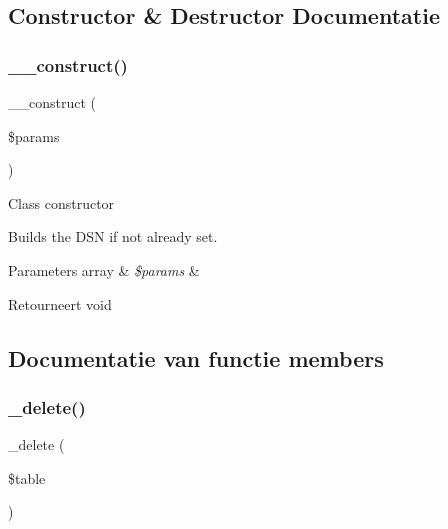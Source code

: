 \subsection{Constructor \& Destructor Documentatie}
\mbox{\label{class_c_i___d_b__pdo__oci__driver_a9162320adff1a1a4afd7f2372f753a3e}} 
\subsubsection{\texorpdfstring{\_\_construct()}{\_\_construct()}}
{\footnotesize\ttfamily \+\_\+\+\_\+construct (\begin{DoxyParamCaption}\item[{}]{\$params }\end{DoxyParamCaption})}

Class constructor

Builds the D\+SN if not already set.


\begin{DoxyParams}[1]{Parameters}
array & {\em \$params} & \\
\hline
\end{DoxyParams}
\begin{DoxyReturn}{Retourneert}
void 
\end{DoxyReturn}


\subsection{Documentatie van functie members}
\mbox{\label{class_c_i___d_b__pdo__oci__driver_a133ea8446ded52589bd22cc9163d0896}} 
\subsubsection{\texorpdfstring{\_delete()}{\_delete()}}
{\footnotesize\ttfamily \+\_\+delete (\begin{DoxyParamCaption}\item[{}]{\$table }\end{DoxyParamCaption})\hspace{0.3cm}{\ttfamily [protected]}}

